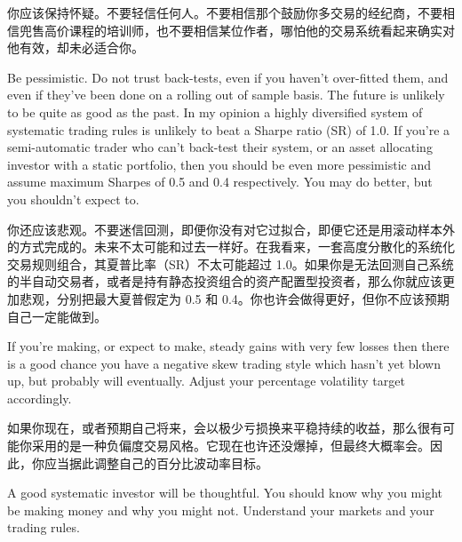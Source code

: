 \begin{chineseblock}你应该保持怀疑。不要轻信任何人。不要相信那个鼓励你多交易的经纪商，不要相信兜售高价课程的培训师，也不要相信某位作者，哪怕他的交易系统看起来确实对他有效，却未必适合你。\end{chineseblock}

\bipairgap

\begin{englishblock} Be pessimistic. Do not trust back-tests, even if you haven't over-fitted them, and even if they've been done on a rolling out of sample basis. The future is unlikely to be quite as good as the past. In my opinion a highly diversified system of systematic trading rules is unlikely to beat a Sharpe ratio (SR) of 1.0. If you're a semi-automatic trader who can't back-test their system, or an asset allocating investor with a static portfolio, then you should be even more pessimistic and assume maximum Sharpes of 0.5 and 0.4 respectively. You may do better, but you shouldn't expect to. \end{englishblock}

\begin{chineseblock}你还应该悲观。不要迷信回测，即便你没有对它过拟合，即便它还是用滚动样本外的方式完成的。未来不太可能和过去一样好。在我看来，一套高度分散化的系统化交易规则组合，其夏普比率（SR）不太可能超过 1.0。如果你是无法回测自己系统的半自动交易者，或者是持有静态投资组合的资产配置型投资者，那么你就应该更加悲观，分别把最大夏普假定为 0.5 和 0.4。你也许会做得更好，但你不应该预期自己一定能做到。\end{chineseblock}

\bipairgap

\begin{englishblock} If you're making, or expect to make, steady gains with very few losses then there is a good chance you have a negative skew trading style which hasn't yet blown up, but probably will eventually. Adjust your percentage volatility target accordingly. \end{englishblock}

\begin{chineseblock}如果你现在，或者预期自己将来，会以极少亏损换来平稳持续的收益，那么很有可能你采用的是一种负偏度交易风格。它现在也许还没爆掉，但最终大概率会。因此，你应当据此调整自己的百分比波动率目标。\end{chineseblock}

\bipairgap

\begin{englishblock} A good systematic investor will be thoughtful. You should know why you might be making money and why you might not. Understand your markets and your trading rules. \end{englishblock}

